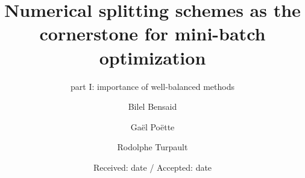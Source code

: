 \newcommand{\Frac}[2]{\displaystyle \frac{#1}{#2}\otimes }
\newcommand{\BlackBox}{\rule{1.5ex}{1.5ex}}

\newcommand{\polyTwo}{PolyGlobalMild }
\newcommand{\polyThree}{PolyLocalMild }
\newcommand{\polyFour}{PolyGlobalStiff }
\newcommand{\polyFive}{PolyAllStiff }

\newcommand{\exOne}{$"2Gen"$ }
\newcommand{\exTwo}{$"2Ego>Gen"$ }
\newcommand{\exThree}{$"2Ego<Eq<Gen"$ }
\newcommand{\exFour}{$"2Ego\ll Gen"$ }
\newcommand{\exFive}{$"3Gen"$ }
\newcommand{\exSix}{$"3Ego<2Plot\approx Gen"$ }
\newcommand{\exSeven}{$"3Ego\ll Gen"$ }
\newcommand{\exHeight}{$"4Ego<2Plot<Gen"$ }

\newcommand{\mg}{gm} %
\newcommand{\ml}{lm}
\newcommand{\ps}{sp}






\title{Numerical splitting schemes as the cornerstone for mini-batch optimization}
\subtitle{part I: importance of well-balanced methods}


\author{Bilel Bensaid     \and
		Ga\"el Po\"ette   \and
        Rodolphe Turpault
}



\date{Received: date / Accepted: date}


\maketitle

